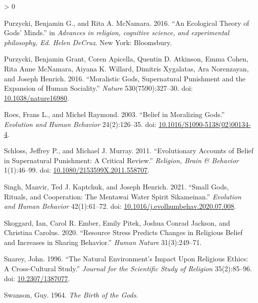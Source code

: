 \documentclass[
]{article}
\newlength{\cslhangindent}
\newenvironment{CSLReferences}[2] %
 {%
  \setlength{\parindent}{0pt}
  \ifodd #1 \everypar{\setlength{\hangindent}{\cslhangindent}}\ignorespaces\fi
  \ifnum #2 > 0
  \setlength{\parskip}{#2\baselineskip}
  \fi
 }%
 {}
\begin{document}
\begin{CSLReferences}{1}{0}
\leavevmode\hypertarget{ref-purzyckiEcologicalTheoryGods2016}{}%
Purzycki, Benjamin G., and Rita A. McNamara. 2016. {``An {Ecological} {Theory} of {Gods}' {Minds}.''} in \emph{Advances in religion, cognitive science, and experimental philosophy, {Ed}. {Helen} {DeCruz}}. New York: Bloomsbury.

\leavevmode\hypertarget{ref-purzyckiMoralisticGodsSupernatural2016}{}%
Purzycki, Benjamin Grant, Coren Apicella, Quentin D. Atkinson, Emma Cohen, Rita Anne McNamara, Aiyana K. Willard, Dimitris Xygalatas, Ara Norenzayan, and Joseph Henrich. 2016. {``Moralistic Gods, Supernatural Punishment and the Expansion of Human Sociality.''} \emph{Nature} 530(7590):327--30. doi: \href{https://doi.org/10.1038/nature16980}{10.1038/nature16980}.

\leavevmode\hypertarget{ref-roesBeliefMoralizingGods2003}{}%
Roes, Frans L., and Michel Raymond. 2003. {``Belief in Moralizing Gods.''} \emph{Evolution and Human Behavior} 24(2):126--35. doi: \href{https://doi.org/10.1016/S1090-5138(02)00134-4}{10.1016/S1090-5138(02)00134-4}.

\leavevmode\hypertarget{ref-schlossEvolutionaryAccountsBelief2011}{}%
Schloss, Jeffrey P., and Michael J. Murray. 2011. {``Evolutionary Accounts of Belief in Supernatural Punishment: A Critical Review.''} \emph{Religion, Brain \& Behavior} 1(1):46--99. doi: \href{https://doi.org/10.1080/2153599X.2011.558707}{10.1080/2153599X.2011.558707}.

\leavevmode\hypertarget{ref-singhSmallGodsRituals2021}{}%
Singh, Manvir, Ted J. Kaptchuk, and Joseph Henrich. 2021. {``Small Gods, Rituals, and Cooperation: {The} {Mentawai} Water Spirit {Sikameinan}.''} \emph{Evolution and Human Behavior} 42(1):61--72. doi: \href{https://doi.org/10.1016/j.evolhumbehav.2020.07.008}{10.1016/j.evolhumbehav.2020.07.008}.

\leavevmode\hypertarget{ref-skoggard2020resource}{}%
Skoggard, Ian, Carol R. Ember, Emily Pitek, Joshua Conrad Jackson, and Christina Carolus. 2020. {``Resource Stress Predicts Changes in Religious Belief and Increases in Sharing Behavior.''} \emph{Human Nature} 31(3):249--71.

\leavevmode\hypertarget{ref-snareyNaturalEnvironmentImpact1996}{}%
Snarey, John. 1996. {``The {Natural} {Environment}'s {Impact} Upon {Religious} {Ethics}: {A} {Cross}-{Cultural} {Study}.''} \emph{Journal for the Scientific Study of Religion} 35(2):85--96. doi: \href{https://doi.org/10.2307/1387077}{10.2307/1387077}.

\leavevmode\hypertarget{ref-swansonBirthGods1964}{}%
Swanson, Guy. 1964. \emph{The {Birth} of the {Gods}}.


\end{CSLReferences}
\end{document}
